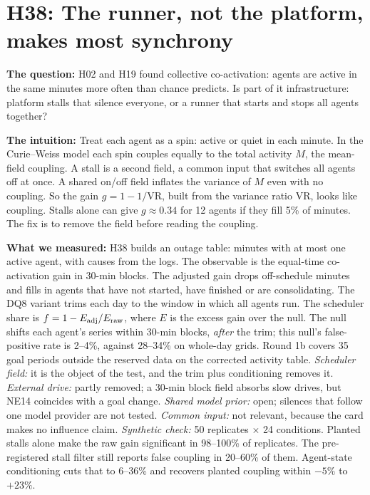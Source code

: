 \section{H38: The runner, not the platform, makes most synchrony}

\textbf{The question:}
H02 and H19 found collective co-activation: agents are active in the same minutes more often than chance predicts.
Is part of it infrastructure: platform stalls that silence everyone, or a runner that starts and stops all agents together?

\textbf{The intuition:}
Treat each agent as a spin: active or quiet in each minute.
In the Curie--Weiss model each spin couples equally to the total activity $M$, the mean-field coupling.
A stall is a second field, a common input that switches all agents off at once.
A shared on/off field inflates the variance of $M$ even with no coupling.
So the gain $g=1-1/\mathrm{VR}$, built from the variance ratio VR, looks like coupling.
Stalls alone can give $g\approx0.34$ for 12 agents if they fill 5\% of minutes.
The fix is to remove the field before reading the coupling.

\textbf{What we measured:}
H38 builds an outage table: minutes with at most one active agent, with causes from the logs.
The observable is the equal-time co-activation gain in 30-min blocks.
The adjusted gain drops off-schedule minutes and fills in agents that have not started, have finished or are consolidating.
The DQ8 variant trims each day to the window in which all agents run.
The scheduler share is $f=1-E_{\rm adj}/E_{\rm raw}$, where $E$ is the excess gain over the null.
The null shifts each agent's series within 30-min blocks, \emph{after} the trim; this null's false-positive rate is 2--4\%, against 28--34\% on whole-day grids.
Round 1b covers 35 goal periods outside the reserved data on the corrected activity table.
\emph{Scheduler field:} it is the object of the test, and the trim plus conditioning removes it.
\emph{External drive:} partly removed; a 30-min block field absorbs slow drives, but NE14 coincides with a goal change.
\emph{Shared model prior:} open; silences that follow one model provider are not tested.
\emph{Common input:} not relevant, because the card makes no influence claim.
\emph{Synthetic check:} 50 replicates $\times$ 24 conditions.
Planted stalls alone make the raw gain significant in 98--100\% of replicates.
The pre-registered stall filter still reports false coupling in 20--60\% of them.
Agent-state conditioning cuts that to 6--36\% and recovers planted coupling within $-5\%$ to $+23\%$.

